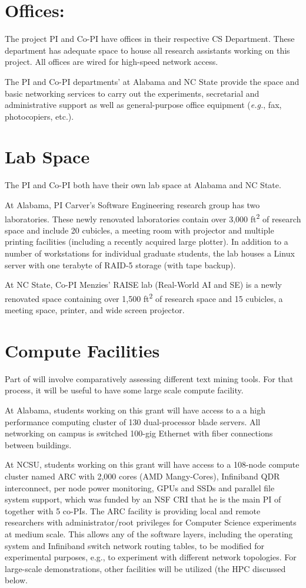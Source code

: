  
 
\section*{Offices:}
The project PI and Co-PI have 
offices in their respective CS Department.  These
department
has adequate space to house all research assistants
working on this project. All offices are wired for high-speed network
access.

The PI and Co-PI departments' at Alabama and NC State provide the space and basic networking services to
carry out the experiments, secretarial and administrative support as
well as general-purpose office equipment ({\em e.g.}, fax, photocopiers,
etc.).

\section*{Lab Space}
The PI and Co-PI both have their own lab
space at Alabama and NC State.
\bi
\item
At Alabama, PI  Carver's
 Software Engineering research group has two laboratories. These newly renovated laboratories contain over 3,000 ft\textsuperscript{2} of research space and include 20 cubicles, a meeting room with projector and multiple printing facilities (including a recently acquired large plotter). In addition to a number of workstations for individual graduate students, the lab houses a Linux server with one terabyte of RAID-5 storage (with tape backup).
\item
At NC State, Co-PI  Menzies' RAISE lab (Real-World 
AI and SE) is a newly renovated space 
containing over 1,500 ft\textsuperscript{2} of research space and 
15 cubicles, a meeting space, printer, and wide screen projector. 
\ei
\section*{Compute Facilities}
Part of {\IT} will involve comparatively assessing different text mining tools. For that process, it will be useful to have some large scale compute facility.

 At Alabama, students working on this grant will have access to a  a high performance computing cluster of 130 dual-processor blade servers.  All networking on campus is switched 100-gig Ethernet with fiber connections between buildings.  
 
 At NCSU, students working on this grant will have access to  a 108-node compute cluster named ARC with 
2,000 cores (AMD Mangy-Cores), Infiniband QDR interconnect, per node
power monitoring, GPUs and SSDs and parallel file system support,
which was funded by an NSF CRI that he is the main PI of together with
5 co-PIs.  
The ARC facility is providing local and remote researchers with
administrator/root privileges for Computer Science experiments at
medium scale. This allows any of the software layers, including the
operating system and Infiniband switch network routing tables, to be
modified for experimental purposes, e.g., to experiment with different
network topologies.  For large-scale demonstrations, other 
facilities will be utilized (the HPC discussed below.


